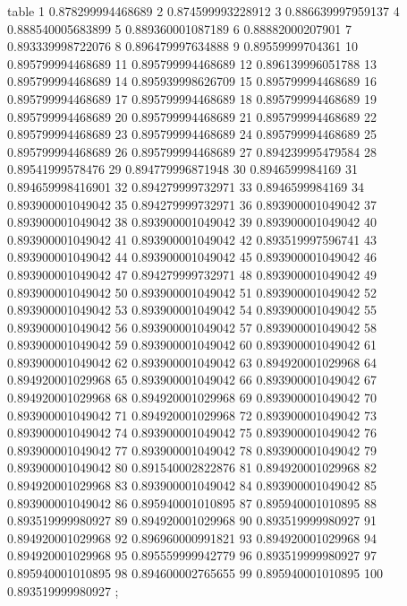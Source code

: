 table {%
	1 0.878299994468689
	2 0.874599993228912
	3 0.886639997959137
	4 0.888540005683899
	5 0.889360001087189
	6 0.88882000207901
	7 0.893339998722076
	8 0.896479997634888
	9 0.89559999704361
	10 0.895799994468689
	11 0.895799994468689
	12 0.896139996051788
	13 0.895799994468689
	14 0.895939998626709
	15 0.895799994468689
	16 0.895799994468689
	17 0.895799994468689
	18 0.895799994468689
	19 0.895799994468689
	20 0.895799994468689
	21 0.895799994468689
	22 0.895799994468689
	23 0.895799994468689
	24 0.895799994468689
	25 0.895799994468689
	26 0.895799994468689
	27 0.894239995479584
	28 0.89541999578476
	29 0.894779996871948
	30 0.8946599984169
	31 0.894659998416901
	32 0.894279999732971
	33 0.8946599984169
	34 0.893900001049042
	35 0.894279999732971
	36 0.893900001049042
	37 0.893900001049042
	38 0.893900001049042
	39 0.893900001049042
	40 0.893900001049042
	41 0.893900001049042
	42 0.893519997596741
	43 0.893900001049042
	44 0.893900001049042
	45 0.893900001049042
	46 0.893900001049042
	47 0.894279999732971
	48 0.893900001049042
	49 0.893900001049042
	50 0.893900001049042
	51 0.893900001049042
	52 0.893900001049042
	53 0.893900001049042
	54 0.893900001049042
	55 0.893900001049042
	56 0.893900001049042
	57 0.893900001049042
	58 0.893900001049042
	59 0.893900001049042
	60 0.893900001049042
	61 0.893900001049042
	62 0.893900001049042
	63 0.894920001029968
	64 0.894920001029968
	65 0.893900001049042
	66 0.893900001049042
	67 0.894920001029968
	68 0.894920001029968
	69 0.893900001049042
	70 0.893900001049042
	71 0.894920001029968
	72 0.893900001049042
	73 0.893900001049042
	74 0.893900001049042
	75 0.893900001049042
	76 0.893900001049042
	77 0.893900001049042
	78 0.893900001049042
	79 0.893900001049042
	80 0.891540002822876
	81 0.894920001029968
	82 0.894920001029968
	83 0.893900001049042
	84 0.893900001049042
	85 0.893900001049042
	86 0.895940001010895
	87 0.895940001010895
	88 0.893519999980927
	89 0.894920001029968
	90 0.893519999980927
	91 0.894920001029968
	92 0.896960000991821
	93 0.894920001029968
	94 0.894920001029968
	95 0.895559999942779
	96 0.893519999980927
	97 0.895940001010895
	98 0.894600002765655
	99 0.895940001010895
	100 0.893519999980927
};
